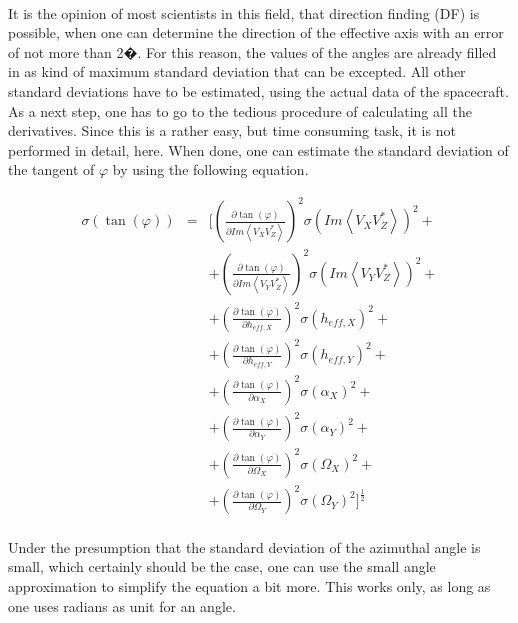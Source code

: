\documentclass[a4paper,10pt]{thesis}
\begin{document}
\paragraph*{}
It is the opinion of most scientists in this field, that direction finding (DF) is possible, when one can determine the direction of the effective axis with an error of not more than 2�. For this reason, the values of the angles are already filled in  as kind of maximum standard deviation that can be excepted. All other standard deviations have to be estimated, using the actual data of the spacecraft. As a next step, one has to go to the tedious procedure of calculating all the derivatives. Since this is a rather easy, but time consuming task, it is not performed in detail, here. When done, one can estimate the standard deviation of the tangent of $\varphi$ by using the following equation.

\begin{eqnarray}
\sigma (\tan (\varphi)) &=&  [(\frac{\partial \tan (\varphi)}{\partial Im \left\langle V_X V_Z^{*}\right\rangle})^2 \sigma (Im \left\langle V_X V_Z^{*}\right\rangle)^2+\\
&&+ (\frac{\partial \tan (\varphi)}{\partial Im \left\langle V_Y V_Z^{*}\right\rangle})^2 \sigma (Im \left\langle V_Y V_Z^{*}\right\rangle)^2 +\nonumber \\
&&+ (\frac{\partial \tan (\varphi)}{\partial h_{eff,X}})^2 \sigma (h_{eff,X})^2+ \nonumber \\
&&+ (\frac{\partial \tan (\varphi)}{\partial h_{eff,Y}})^2 \sigma (h_{eff,Y})^2+ \nonumber \\
&&+ (\frac{\partial \tan (\varphi)}{\partial \alpha_X})^2 \sigma (\alpha_X)^2+ \nonumber \\
&&+ (\frac{\partial \tan (\varphi)}{\partial \alpha_Y})^2 \sigma (\alpha_Y)^2+ \nonumber \\
&& +(\frac{\partial \tan (\varphi)}{\partial \Omega_X})^2 \sigma (\Omega_X)^2+ \nonumber \\
&&+ (\frac{\partial \tan (\varphi)}{\partial \Omega_Y})^2 \sigma (\Omega_Y)^2]^\frac{1}{2} \nonumber
\end{eqnarray}

\paragraph*{}
Under the presumption that the standard deviation of the azimuthal angle is small, which certainly should be the case, one can use the small angle approximation to simplify the equation a bit more. This works only, as long as one uses radians as unit for an angle.
\end{document}
